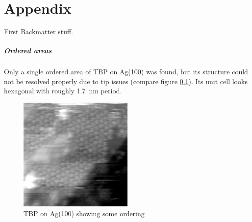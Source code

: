 \cleardoublepage
\chapter*{Appendix}
First Backmatter stuff.


\paragraph{Ordered areas}
Only a single ordered area of TBP on Ag(100) was found, but its structure could not be resolved properly due to tip issues (compare figure \ref{fig:hex-TBP-Ag100}). Its unit cell looks hexagonal with roughly \SI{1.7} {\nano \meter} period. 

\begin{figure}[h]
	\centering
	\includegraphics[width=0.5\textwidth]{./images/F151007-112800}
	\caption{TBP on Ag(100) showing some ordering}
	\label{fig:hex-TBP-Ag100}
\end{figure}


